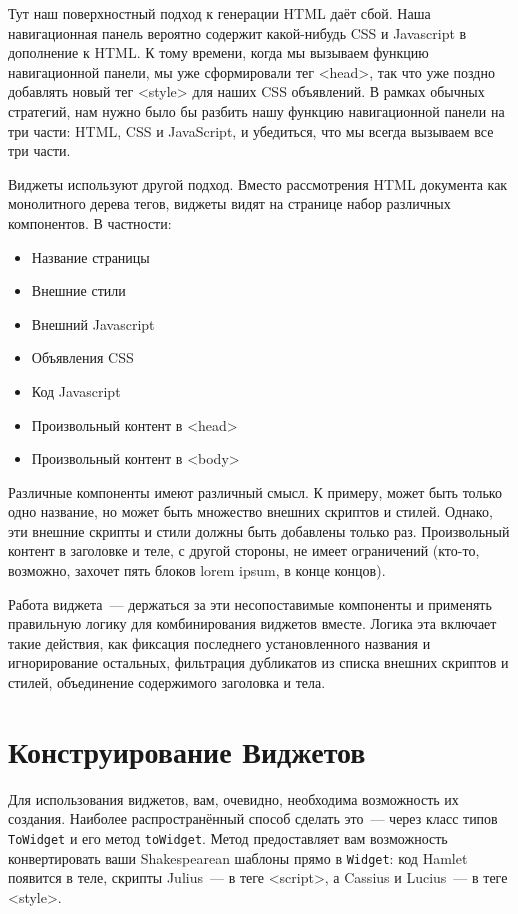 Тут наш поверхностный подход к генерации HTML даёт сбой. Наша навигационная
панель вероятно содержит какой-нибудь CSS и Javascript в дополнение к HTML. К
тому времени, когда мы вызываем функцию навигационной панели, мы уже
сформировали тег <head>, так что уже поздно добавлять новый тег <style> для
наших CSS объявлений. В рамках обычных стратегий, нам нужно было бы разбить
нашу функцию навигационной панели на три части: HTML, CSS и JavaScript, и
убедиться, что мы всегда вызываем все три части.

Виджеты используют другой подход. Вместо рассмотрения HTML документа как
монолитного дерева тегов, виджеты видят на странице набор различных
компонентов. В частности:
\begin{itemize}
    \item Название страницы
    \item Внешние стили
    \item Внешний Javascript
    \item Объявления CSS
    \item Код Javascript
    \item Произвольный контент в <head>
    \item Произвольный контент в <body>
\end{itemize}

Различные компоненты имеют различный смысл. К примеру, может быть только одно
название, но может быть множество внешних скриптов и стилей. Однако, эти
внешние скрипты и стили должны быть добавлены только раз. Произвольный контент
в заголовке и теле, с другой стороны, не имеет ограничений (кто-то, возможно,
захочет пять блоков lorem ipsum, в конце концов).

Работа виджета~--- держаться за эти несопоставимые компоненты и применять
правильную логику для комбинирования виджетов вместе. Логика эта включает такие
действия, как фиксация последнего установленного названия и игнорирование
остальных, фильтрация дубликатов из списка внешних скриптов и стилей,
объединение содержимого заголовка и тела.

\section{Конструирование Виджетов}
Для использования виджетов, вам, очевидно, необходима возможность их создания.
Наиболее распространённый способ сделать это~--- через класс типов
\lstinline'ToWidget' и его метод \lstinline'toWidget'. Метод предоставляет вам
возможность конвертировать ваши Shakespearean шаблоны прямо в
\lstinline'Widget': код Hamlet появится в теле, скрипты Julius~--- в теге
<script>, а Cassius и Lucius~--- в теге <style>.

